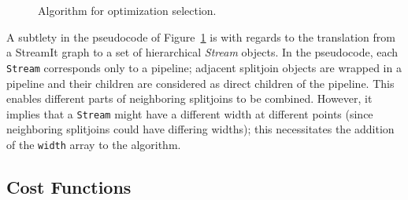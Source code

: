 \begin{figure}[t]
  \vspace{-4pt}
  \vspace{-16pt}
  \caption{Algorithm for optimization selection.
  \vspace{-22pt}
  \protect\label{fig:part-alg}}
\end{figure}

A subtlety in the pseudocode of Figure~\ref{fig:part-alg} is with
regards to the translation from a StreamIt graph to a set of
hierarchical {\it Stream} objects.  In the pseudocode, each {\tt
Stream} corresponds only to a pipeline; adjacent splitjoin objects are
wrapped in a pipeline and their children are considered as direct
children of the pipeline. This enables different parts of neighboring
splitjoins to be combined.  However, it implies that a {\tt Stream}
might have a different width at different points (since neighboring
splitjoins could have differing widths); this necessitates the
addition of the {\tt width} array to the algorithm.

\subsection{Cost Functions}
\label{sec:cost}

